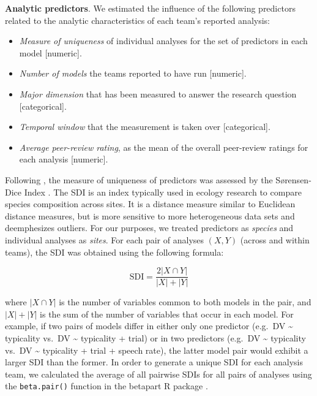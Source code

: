 \documentclass[Review,times,sageh]{sagej}
\providecommand{\tightlist}{\setlength{\itemsep}{0pt}\setlength{\parskip}{0pt}}
\begin{document}
\textbf{Analytic predictors}. We estimated the influence of the following predictors related to the analytic characteristics of each team's reported analysis:

\begin{itemize}
\tightlist
\item
  \emph{Measure of uniqueness} of individual analyses for the set of predictors in each model {[}numeric{]}.
\item
  \emph{Number of models} the teams reported to have run {[}numeric{]}.
\item
  \emph{Major dimension} that has been measured to answer the research question {[}categorical{]}.
\item
  \emph{Temporal window} that the measurement is taken over {[}categorical{]}.
\item
  \emph{Average peer-review rating}, as the mean of the overall peer-review ratings for each analysis {[}numeric{]}.
\end{itemize}

Following \citet{Parker2020}, the measure of uniqueness of predictors was assessed by the Sørensen-Dice Index \citep[SDI,][]{dice1945, sorensen1948}.
The SDI is an index typically used in ecology research to compare species composition across sites.
It is a distance measure similar to Euclidean distance measures, but is more sensitive to more heterogeneous data sets and deemphesizes outliers.
For our purposes, we treated predictors as \emph{species} and individual analyses as \emph{sites}.
For each pair of analyses \((X, Y)\) (across and within teams), the SDI was obtained using the following formula:

\[\text{SDI} = \frac{2|X \cap Y|}{|X|+|Y|}\]
\vspace{0.05in}

\noindent where \(|X \cap Y|\) is the number of variables common to both models in the pair, and \(|X|+|Y|\) is the sum of the number of variables that occur in each model.
For example, if two pairs of models differ in either only one predictor (e.g.~DV \textasciitilde{} typicality vs.~DV \textasciitilde{} typicality + trial) or in two predictors (e.g.~DV \textasciitilde{} typicality vs.~DV \textasciitilde{} typicality + trial + speech rate), the latter model pair would exhibit a larger SDI than the former.
In order to generate a unique SDI for each analysis team, we calculated the average of all pairwise SDIs for all pairs of analyses using the \texttt{beta.pair()} function in the betapart R package \citep{baselga2020}.
\end{document}
